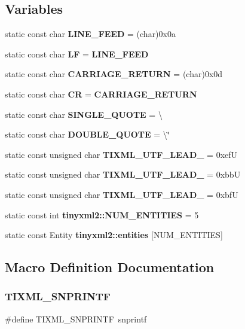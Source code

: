 \subsection*{Variables}
\begin{DoxyCompactItemize}
\item 
static const char \textbf{ L\+I\+N\+E\+\_\+\+F\+E\+ED} = (char)0x0a
\item 
static const char \textbf{ LF} = \textbf{ L\+I\+N\+E\+\_\+\+F\+E\+ED}
\item 
static const char \textbf{ C\+A\+R\+R\+I\+A\+G\+E\+\_\+\+R\+E\+T\+U\+RN} = (char)0x0d
\item 
static const char \textbf{ CR} = \textbf{ C\+A\+R\+R\+I\+A\+G\+E\+\_\+\+R\+E\+T\+U\+RN}
\item 
static const char \textbf{ S\+I\+N\+G\+L\+E\+\_\+\+Q\+U\+O\+TE} = \textquotesingle{}\textbackslash{}\textquotesingle{}\textquotesingle{}
\item 
static const char \textbf{ D\+O\+U\+B\+L\+E\+\_\+\+Q\+U\+O\+TE} = \textquotesingle{}\textbackslash{}\char`\"{}\textquotesingle{}
\item 
static const unsigned char \textbf{ T\+I\+X\+M\+L\+\_\+\+U\+T\+F\+\_\+\+L\+E\+A\+D\+\_} = 0xefU
\item 
static const unsigned char \textbf{ T\+I\+X\+M\+L\+\_\+\+U\+T\+F\+\_\+\+L\+E\+A\+D\+\_} = 0xbbU
\item 
static const unsigned char \textbf{ T\+I\+X\+M\+L\+\_\+\+U\+T\+F\+\_\+\+L\+E\+A\+D\+\_} = 0xbfU
\item 
static const int \textbf{ tinyxml2\+::\+N\+U\+M\+\_\+\+E\+N\+T\+I\+T\+I\+ES} = 5
\item 
static const Entity \textbf{ tinyxml2\+::entities} [N\+U\+M\+\_\+\+E\+N\+T\+I\+T\+I\+ES]
\end{DoxyCompactItemize}


\subsection{Macro Definition Documentation}
\mbox{\label{tinyxml2_8cpp_afc6433f9b56e4f18833089b1df629e0a}} 
\subsubsection{TIXML\_SNPRINTF}
{\footnotesize\ttfamily \#define T\+I\+X\+M\+L\+\_\+\+S\+N\+P\+R\+I\+N\+TF~snprintf}




